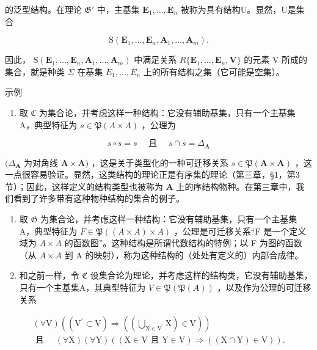 的泛型结构。在理论 \(\mathfrak{G}'\) 中，主基集 \(\mathbf{E}_1, \ldots, \mathbf{E}_n\) 被称为具有结构U。显然，U是集合

\[
\mathrm{S} (\mathbf {E} _ {1}, \dots , \mathbf {E} _ {n}, \mathbf {A} _ {1}, \dots , \mathbf {A} _ {m}).
\]

因此， \(\mathrm{S}(\mathbf{E}_{1},\ldots,\mathbf{E}_{n},\mathbf{A}_{1},\ldots,\mathbf{A}_{m})\) 中满足关系 \(R\{\mathbf{E}_{1},\ldots,\mathbf{E}_{n},\mathbf{V}\}\) 的元素 V 所成的集合，就是种类 \(\Sigma\) 在基集 \(E_{1},\ldots,E_{n}\) 上的所有结构之集（它可能是空集）。

示例

\begin{enumerate}
\def\labelenumi{(\arabic{enumi})}
\tightlist
\item
  取 \(\mathfrak{C}\) 为集合论，并考虑这样一种结构：它没有辅助基集，只有一个主基集 A，典型特征为 \(s \in \mathfrak{P}(A \times A)\) ，公理为
\end{enumerate}

\[
s \circ s = s \quad \text { 且 } \quad s \cap \overline{s} = \Delta_{\mathbf{A}}
\]

\((\Delta_{\mathbf{A}}\) 为对角线 \(\mathbf{A} \times \mathbf{A})\) ，这是关于类型化的一种可迁移关系 \(s \in \mathfrak{P}(\mathbf{A} \times \mathbf{A})\) ，这一点很容易验证。显然，这类结构的理论正是有序集的理论（第三章，§1，第3节）；因此，这样定义的结构类型也被称为 \(\mathbf{A}\) 上的序结构物种。在第三章中，我们看到了许多带有这种物种结构的集合的例子。

\begin{enumerate}
\def\labelenumi{(\arabic{enumi})}
\setcounter{enumi}{1}
\item
  取 \(\mathfrak{G}\) 为集合论，并考虑这样一种结构：它没有辅助基集，只有一个主基集 A，典型特征为 \(F \in \mathfrak{P}((A \times A) \times A)\) ，公理是可迁移关系“F 是一个定义域为 \(A \times A\) 的函数图”。这种结构是所谓代数结构的特例；以 F 为图的函数（从 \(A \times A\) 到 A 的映射），称为这种结构的（处处有定义的）内部合成律。
\item
  和之前一样，令 \(\mathfrak{C}\) 设集合论为理论，并考虑这样的结构类，它没有辅助基集，只有一个主基集A，其典型特征为 \(V \in \mathfrak{P}(\mathfrak{P}(A))\) ，以及作为公理的可迁移关系
\end{enumerate}

\[
\begin{array}{l} (\forall \mathrm{V}) ((\mathrm{V} ^ {\prime} \subset \mathrm{V}) \Longrightarrow ((\bigcup_ {\mathrm{X} \in \mathrm{V} ^ {\prime}} \mathrm{X}) \in \mathrm{V})) \\ \text { 且 } \quad (\forall \mathrm{X}) (\forall \mathrm{Y}) ((\mathrm{X} \in \mathrm{V} \text {   且   } \mathrm{Y} \in \mathrm{V}) \Longrightarrow ((\mathrm{X} \cap \mathrm{Y}) \in \mathrm{V})). \end{array}
\]

